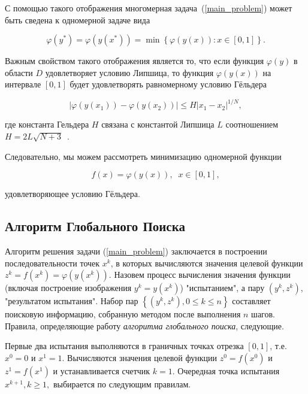 \documentclass[mathematics,article,accept,pdftex,moreauthors]{Definitions/mdpi}
\begin{document}
С помощью такого отображения многомерная задача~(\ref{main_problem}) может быть сведена к одномерной задаче вида
\begin{linenomath}
\begin{equation}
\varphi(y^\ast)=\varphi(y(x^\ast))=\min{\left\{\varphi(y(x)): x\in[0,1]\right\}}.
\end{equation}
\end{linenomath}

Важным свойством такого отображения является то, что если функция $\varphi(y)$ в области $D$ удовлетворяет условию Липшица, то функция $\varphi(y(x))$ на интервале $[0,1 ]$ будет удовлетворять равномерному условию Гёльдера
\begin{linenomath}
\begin{equation}
\left|\varphi(y(x_1))-\varphi(y(x_2))\right|\leq H\left|x_1-x_2\right|^{1/N},
\end{equation}
\end{linenomath}
где константа Гельдера $H$ связана с константой Липшица $L$ соотношением $H=2L\sqrt{N+3}$~\cite{Strongin2000}.


Следовательно, мы можем рассмотреть минимизацию одномерной функции
\begin{linenomath}
\begin{equation}
f(x)=\varphi(y(x)), \;\; x\in[0,1],
\end{equation}
\end{linenomath}
удовлетворяющее условию Гёльдера.




\subsection{Алгоритм Глобального Поиска}\label{GSA}

Алгоритм решения задачи (\ref{main_problem}) заключается в построении последовательности точек $x^k$, в которых вычисляются значения целевой функции $z^k = f(x^k)=\varphi(y(x ^k))$. Назовем процесс вычисления значения функции (включая построение изображения $y^k=y(x^k)$) "испытанием", а пару $(y^k, z^k) $, "результатом испытания". Набор пар $\left\{(y^k, z^k), 0\leq k\leq n\right\}$ составляет поисковую информацию, собранную методом после выполнения $n$ шагов. Правила, определяющие работу \textit{алгоритма глобального поиска}, следующие.

Первые два испытания выполняются в граничных точках отрезка $[0,1]$, т.е. $x^0 = 0$ и $x^1 = 1$. Вычисляются значения целевой функции $z^0 = f(x^0)$ и $z^1 = f(x^1)$ и устанавливается счетчик $k = 1$. Очередная точка испытания $x^{k+1}, k \geq 1,$ выбирается по следующим правилам.
\end{document}
